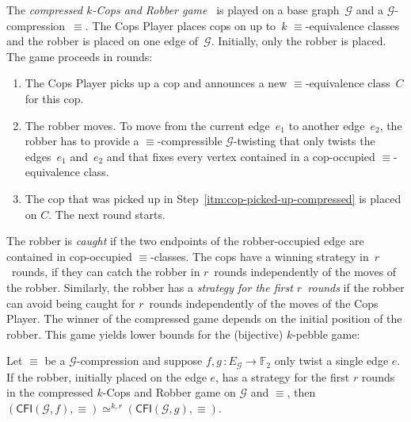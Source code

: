 \documentclass[a4paper,english, thm-restate]{lipics-v2021}
\newcommand{\defining}[1]{\emph{#1}}
\newcommand{\comp}{\equiv}
\newcommand{\CFIsym}{\mathsf{CFI}}
\newcommand{\CFI}[1]{\CFIsym(#1)}
\newcommand{\precompCFI}[2]{{(\CFI{#1},#2)}}
\newcommand{\FF}{\mathbb{F}}
\newcommand{\graphG}{\mathcal{G}}
\newcommand{\edgeG}{E_{\graphG}}
\newcommand{\kequivr}[2]{\simeq^{#1,#2}}
\begin{document}
\noindent
The \defining{compressed $k$-Cops and Robber game}~\cite{DBLP:conf/focs/GroheLNS23} is played on a base graph~$\graphG$ and a $\graphG$\nobreakdash-com\-pression~$\comp$.
The Cops Player places cops on up to~$k$ $\comp$\nobreakdash-equivalence classes and the robber is placed on one edge of~$\graphG$.
Initially, only the robber is placed. The game proceeds in rounds:
\begin{enumerate}
        \item \label{itm:cop-picked-up-compressed} The Cops Player picks up a cop  and announces a new $\comp$-equivalence class~$C$ for this cop.
        \item The robber moves. To move from the current edge~$e_1$ to another edge~$e_2$, the robber has to provide a $\comp$\nobreakdash-compressible $\graphG$\nobreakdash-twisting
        that only twists the edges~$e_1$ and~$e_2$ and that fixes every vertex contained in a cop-occupied $\comp$\nobreakdash-equivalence class.
        \item  The cop that was picked up in Step~\ref{itm:cop-picked-up-compressed} is placed on $C$. The next round starts.
\end{enumerate}
The robber is \defining{caught} if the two endpoints of the robber-occupied edge are contained in cop-occupied $\comp$\nobreakdash-classes.
The cops have a winning strategy in~$r$~rounds,
if they can catch the robber in $r$~rounds independently of the moves of the robber.
Similarly, the robber has a \defining{strategy for the first  $r$~rounds}
if the robber can avoid being caught for $r$~rounds independently of the moves of the Cops Player.
%
The winner of the compressed game depends on the initial position of the robber.
This game yields lower bounds for the (bijective) $k$-pebble game:
\begin{lemma}\label{lem:lowerbound-compressed-cops-and-robbers}
        Let $\comp$ be a $\graphG$-compression and 
        suppose $f,g \, \colon \edgeG \to \FF_2$ only twist a single edge $e$.
        If the robber, initially placed on the edge $e$, has a strategy for the first $r$ rounds in the compressed $k$-Cops and Robber game
        on $\graphG$ and $\comp$, then
        $\precompCFI{\graphG,f}{\comp} \kequivr{k}{r} \precompCFI{\graphG,g}{\comp}$.
\end{lemma}
\end{document}
